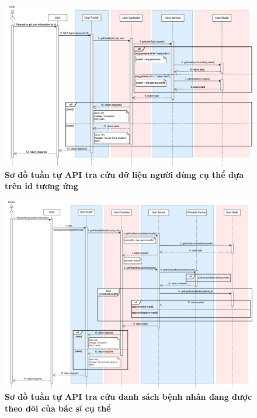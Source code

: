 \begin{figure}[H]
	\centering
	\includegraphics[width=16cm]{Images/api_sequence/user/getUserById.drawio.png}
	\caption[Sơ đồ tuần tự API tra cứu dữ liệu người dùng cụ thể dựa trên id tương ứng]{\bfseries \fontsize{12pt}{0pt}\selectfont Sơ đồ tuần tự API tra cứu dữ liệu người dùng cụ thể dựa trên id tương ứng}
	\label{sequence_diagram_get_user_by_id}
\end{figure}

\begin{figure}[H]
	\centering
	\includegraphics[width=16cm]{Images/api_sequence/user/getPatientByDoctorId.drawio.png}
	\caption[Sơ đồ tuần tự API tra cứu danh sách bệnh nhân đang được theo dõi của bác sĩ cụ thể]{\bfseries \fontsize{12pt}{0pt}\selectfont Sơ đồ tuần tự API tra cứu danh sách bệnh nhân đang được theo dõi của bác sĩ cụ thể}
	\label{sequence_diagram_get_patient_data}
\end{figure}

